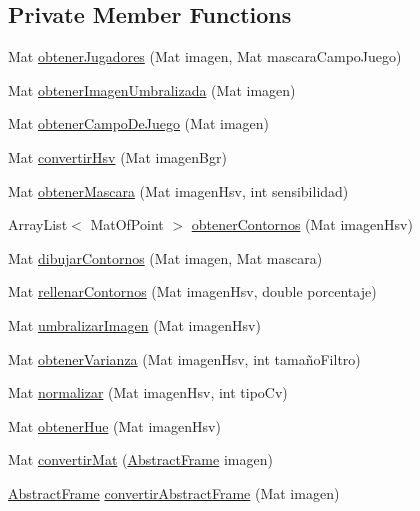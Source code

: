 \subsection*{Private Member Functions}
\begin{DoxyCompactItemize}
\item 
Mat \hyperlink{classfutbol_1_1_procesador_imagenes_futbol_ac35e82c234b3a1608072910df609c6f5}{obtener\+Jugadores} (Mat imagen, Mat mascara\+Campo\+Juego)
\item 
Mat \hyperlink{classfutbol_1_1_procesador_imagenes_futbol_abc746fc064bec1c20d6676dac4677537}{obtener\+Imagen\+Umbralizada} (Mat imagen)
\item 
Mat \hyperlink{classfutbol_1_1_procesador_imagenes_futbol_a1478fb4d97f9f1c5ce7da65559d9d9bd}{obtener\+Campo\+De\+Juego} (Mat imagen)
\item 
Mat \hyperlink{classfutbol_1_1_procesador_imagenes_futbol_a1d5adc24497f2131df236b921457f1d2}{convertir\+Hsv} (Mat imagen\+Bgr)
\item 
Mat \hyperlink{classfutbol_1_1_procesador_imagenes_futbol_a11c662ef58e106c19b0a2bdee7504292}{obtener\+Mascara} (Mat imagen\+Hsv, int sensibilidad)
\item 
Array\+List$<$ Mat\+Of\+Point $>$ \hyperlink{classfutbol_1_1_procesador_imagenes_futbol_a391d5d1edbda46b9de5abdef7280147c}{obtener\+Contornos} (Mat imagen\+Hsv)
\item 
Mat \hyperlink{classfutbol_1_1_procesador_imagenes_futbol_a1178964c980b9d344aae2674f3d39e27}{dibujar\+Contornos} (Mat imagen, Mat mascara)
\item 
Mat \hyperlink{classfutbol_1_1_procesador_imagenes_futbol_af9dbd06665acbcac8e03418a0b1207c4}{rellenar\+Contornos} (Mat imagen\+Hsv, double porcentaje)
\item 
Mat \hyperlink{classfutbol_1_1_procesador_imagenes_futbol_abeec15363609c5b4d3a74da6fdf65da4}{umbralizar\+Imagen} (Mat imagen\+Hsv)
\item 
Mat \hyperlink{classfutbol_1_1_procesador_imagenes_futbol_a2d329b8027ef8b42a322a437e0b1da84}{obtener\+Varianza} (Mat imagen\+Hsv, int tamaño\+Filtro)
\item 
Mat \hyperlink{classfutbol_1_1_procesador_imagenes_futbol_a4bd6c7ed45428bdf30970bb9292bce02}{normalizar} (Mat imagen\+Hsv, int tipo\+Cv)
\item 
Mat \hyperlink{classfutbol_1_1_procesador_imagenes_futbol_a5e1fd4052a65df8d32acedd6b9488567}{obtener\+Hue} (Mat imagen\+Hsv)
\item 
Mat \hyperlink{classfutbol_1_1_procesador_imagenes_futbol_ac939fa4525257d9d737c0cc5804b9d17}{convertir\+Mat} (\hyperlink{classfutbol_1_1_abstract_frame}{Abstract\+Frame} imagen)
\item 
\hyperlink{classfutbol_1_1_abstract_frame}{Abstract\+Frame} \hyperlink{classfutbol_1_1_procesador_imagenes_futbol_af8c46491f6af9db1919244988e94bf16}{convertir\+Abstract\+Frame} (Mat imagen)
\end{DoxyCompactItemize}


